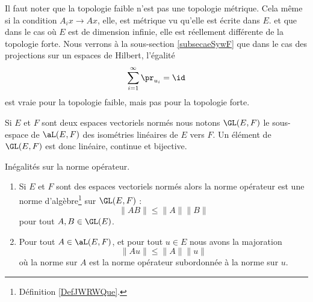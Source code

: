 Il faut noter que la topologie faible n'est pas une topologie métrique. Cela même si la condition \( A_ix\to Ax\), elle, est métrique vu qu'elle est écrite dans \( E\).
et que dans le cas où \( E\) est de dimension infinie, elle est réellement différente de la topologie forte. Nous verrons à la sous-section \ref{subsecaeSywF} que dans le cas des projections sur un espaces de Hilbert, l'égalité
\begin{equation}
    \sum_{i=1}^{\infty}\pr_{u_i}=\id
\end{equation}
est vraie pour la topologie faible, mais pas pour la topologie forte.
\begin{definition}
    Si \( E\) et \( F\) sont deux espaces vectoriels normés nous notons \( \GL(E,F)\) le sous-espace de \( \aL(E,F)\) des isométries linéaires de \( E\) vers \( F\). Un élément de \( \GL(E,F)\) est donc linéaire, continue et bijective.
\end{definition}

\begin{proposition} \label{PropEDvSQsA}
    Inégalités sur la norme opérateur.
    \begin{enumerate}
        \item
    Si \( E\) et \( F\) sont des espaces vectoriels normés alors la norme opérateur est une norme d'algèbre\footnote{Définition \ref{DefJWRWQue}.} sur \( \GL(E,F)\) :
    \begin{equation}
        \| AB \|\leq \| A \|\| B \|
    \end{equation}
    pour tout \( A,B\in\GL(E)\). 
\item   \label{ITEMooLXGEooHoQHoE}
    Pour tout \( A\in \aL(E,F)\), et pour tout \( u\in E\) nous avons la majoration
    \begin{equation}
        \| Au \|\leq \| A \|\| u \|
    \end{equation}
    où la norme sur \( A\) est la norme opérateur subordonnée à la norme sur \( u\).
    \end{enumerate}
\end{proposition}

